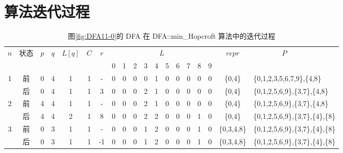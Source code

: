 \chapter{算法迭代过程}
\begin{table}[!htbp]
    \caption{图\ref{fig:DFA11-0}的 DFA 在 DFA::min\_Hopcroft 算法中的迭代过程}
    \label{tab:hopcroft}
    \centering
    \footnotesize%
    \setlength{\tabcolsep}{4pt}%
    \renewcommand{\arraystretch}{1.2}%
    \begin{tabular}{ccccccc|cccccccccc|cl} 
        \toprule%
        \multirow{2}{*}{$n$} & \multirow{2}{*}{状态} & \multirow{2}{*}{$p$} & \multirow{2}{*}{$q$} & \multirow{2}{*}{$L[q]$} & \multirow{2}{*}{$C$} & \multirow{2}{*}{$r$} & \multicolumn{10}{c|}{$L$} & \multirow{2}{*}{$repr$} & \multirow{2}{*}{$\mbox{　　　　}P$}  \\
        \cline{8-17}             &                   &                     &                    &                       &                   &    & 0 & 1 &2 &3 &4 &5 &6 &7 & 8 & 9 & & \\
        \midrule%
        \multirow{2}{*}{1} & 前 & 0 & 4 & 1 & 1 & -  & 0 & 0 & 0 & 0 & 1 & 0 & 0 & 0 & 0 & 0 & \{0,4\} & \{0,1,2,3,5,6,7,9\},\{4,8\} \\
                           & 后 & 0 & 4 & 1 & 1 & 3  & 0 & 0 & 0 & 2 & 1 & 0 & 0 & 0 & 0 & 0 & \{0,4\} & \{0,1,2,5,6,9\},\{3,7\},\{4,8\} \\
        \midrule
        \multirow{2}{*}{2} & 前 & 4 & 4 & 1 & 1 & -  & 0 & 0 & 0 & 2 & 1 & 0 & 0 & 0 & 0 & 0 & \{0,4\} & \{0,1,2,5,6,9\},\{3,7\},\{4,8\} \\
                           & 后 & 4 & 4 & 2 & 1 & 8  & 0 & 0 & 0 & 2 & 2 & 0 & 0 & 0 & 1 & 0 & \{0,4\} & \{0,1,2,5,6,9\},\{3,7\},\{4\},\{8\} \\
        \midrule
        \multirow{2}{*}{3} & 前 & 0 & 3 & 1 & 1 & -  & 0 & 0 & 0 & 1 & 2 & 0 & 0 & 0 & 1 & 0 & \{0,3,4,8\} & \{0,1,2,5,6,9\},\{3,7\},\{4\},\{8\} \\
                           & 后 & 0 & 3 & 1 & 1 & -1 & 0 & 0 & 0 & 1 & 2 & 0 & 0 & 0 & 1 & 0 & \{0,3,4,8\} & \{0,1,2,5,6,9\},\{3,7\},\{4\},\{8\} \\
        \midrule
        

\end{tabular}
\end{table}
